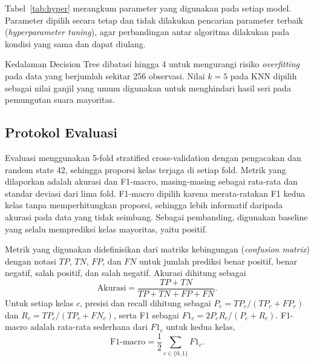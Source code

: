 \documentclass[conference]{IEEEtran}
\begin{document}
Tabel~\ref{tab:hyper} merangkum parameter yang digunakan pada setiap model. Parameter dipilih secara tetap dan tidak dilakukan pencarian parameter terbaik (\emph{hyperparameter tuning}), agar perbandingan antar algoritma dilakukan pada kondisi yang sama dan dapat diulang.

\begin{table}[htbp]
\caption{Parameter setiap model}
\label{tab:hyper}
\centering
{}
\end{table}

Kedalaman Decision Tree dibatasi hingga 4 untuk mengurangi risiko \emph{overfitting} pada data yang berjumlah sekitar 256 observasi. Nilai $k=5$ pada KNN dipilih sebagai nilai ganjil yang umum digunakan untuk menghindari hasil seri pada pemungutan suara mayoritas.

\subsection{Protokol Evaluasi}
Evaluasi menggunakan 5-fold stratified cross-validation dengan pengacakan dan random state 42, sehingga proporsi kelas terjaga di setiap fold. Metrik yang dilaporkan adalah akurasi dan F1-macro, masing-masing sebagai rata-rata dan standar deviasi dari lima fold. F1-macro dipilih karena merata-ratakan F1 kedua kelas tanpa memperhitungkan proporsi, sehingga lebih informatif daripada akurasi pada data yang tidak seimbang. Sebagai pembanding, digunakan baseline yang selalu memprediksi kelas mayoritas, yaitu positif.

Metrik yang digunakan didefinisikan dari matriks kebingungan (\emph{confusion matrix}) dengan notasi $TP$, $TN$, $FP$, dan $FN$ untuk jumlah prediksi benar positif, benar negatif, salah positif, dan salah negatif. Akurasi dihitung sebagai
\begin{equation}
\text{Akurasi} = \frac{TP + TN}{TP + TN + FP + FN}.
\end{equation}
Untuk setiap kelas $c$, presisi dan recall dihitung sebagai $P_c = TP_c/(TP_c + FP_c)$ dan $R_c = TP_c/(TP_c + FN_c)$, serta F1 sebagai $F1_c = 2P_cR_c/(P_c + R_c)$. F1-macro adalah rata-rata sederhana dari $F1_c$ untuk kedua kelas,
\begin{equation}
\text{F1-macro} = \frac{1}{2}\sum_{c \in \{0,1\}} F1_c.
\end{equation}
\end{document}
